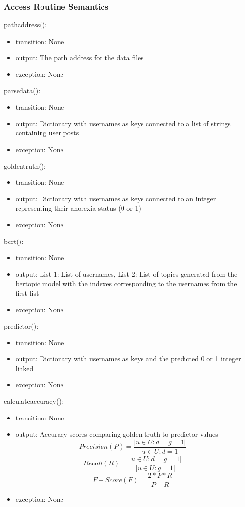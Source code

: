\documentclass[12pt, titlepage]{article}
\begin{document}
\subsubsection{Access Routine Semantics}

\noindent pathaddress():
\begin{itemize}
\item transition: None
\item output: The path address for the data files
\item exception: None
\end{itemize}

\noindent parsedata():
\begin{itemize}
\item transition: None
\item output: Dictionary with usernames as keys connected to a list of strings containing user posts
\item exception: None
\end{itemize}

\noindent goldentruth():
\begin{itemize}
\item transition: None
\item output: Dictionary with usernames as keys connected to an integer representing their anorexia status (0 or 1)
\item exception: None
\end{itemize}

\noindent bert():
\begin{itemize}
\item transition: None
\item output: List 1: List of usernames, List 2: List of topics generated from the bertopic model with the indexes corresponding to the usernames from the first list
\item exception: None
\end{itemize}

\noindent predictor():
\begin{itemize}
\item transition: None
\item output: Dictionary with usernames as keys and the predicted 0 or 1 integer linked
\item exception: None
\end{itemize}

\noindent calculateaccuracy():
\begin{itemize}
\item transition: None
\item output: Accuracy scores comparing golden truth to predictor values
\[ Precision (P) = \frac{|u \in U: d = g = 1|}{|u \in U: d = 1|} \]
\[ Recall (R) = \frac{|u \in U: d = g = 1|}{|u \in U: g = 1|} \]
\[ F-Score (F) = \frac{2*P*R}{P+R} \]
\item exception: None
\end{itemize}
\end{document}
